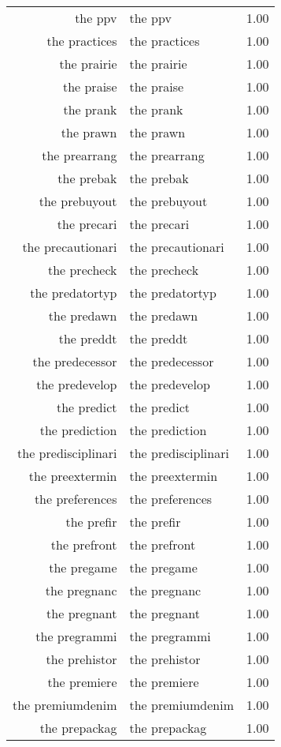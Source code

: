 \begin{table}[ht]
\begin{tabular}{rlr}
  the ppv & the ppv & 1.00 \\ 
  the practices & the practices & 1.00 \\ 
  the prairie & the prairie & 1.00 \\ 
  the praise & the praise & 1.00 \\ 
  the prank & the prank & 1.00 \\ 
  the prawn & the prawn & 1.00 \\ 
  the prearrang & the prearrang & 1.00 \\ 
  the prebak & the prebak & 1.00 \\ 
  the prebuyout & the prebuyout & 1.00 \\ 
  the precari & the precari & 1.00 \\ 
  the precautionari & the precautionari & 1.00 \\ 
  the precheck & the precheck & 1.00 \\ 
  the predatortyp & the predatortyp & 1.00 \\ 
  the predawn & the predawn & 1.00 \\ 
  the preddt & the preddt & 1.00 \\ 
  the predecessor & the predecessor & 1.00 \\ 
  the predevelop & the predevelop & 1.00 \\ 
  the predict & the predict & 1.00 \\ 
  the prediction & the prediction & 1.00 \\ 
  the predisciplinari & the predisciplinari & 1.00 \\ 
  the preextermin & the preextermin & 1.00 \\ 
  the preferences & the preferences & 1.00 \\ 
  the prefir & the prefir & 1.00 \\ 
  the prefront & the prefront & 1.00 \\ 
  the pregame & the pregame & 1.00 \\ 
  the pregnanc & the pregnanc & 1.00 \\ 
  the pregnant & the pregnant & 1.00 \\ 
  the pregrammi & the pregrammi & 1.00 \\ 
  the prehistor & the prehistor & 1.00 \\ 
  the premiere & the premiere & 1.00 \\ 
  the premiumdenim & the premiumdenim & 1.00 \\ 
  the prepackag & the prepackag & 1.00 \\ 

\end{tabular}
\end{table}
